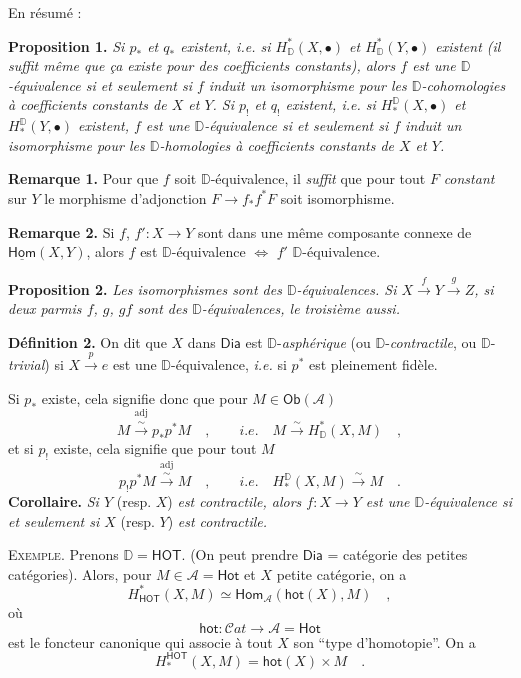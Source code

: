 \documentclass[11pt]{article}
\newcommand{\printedpage}[1]{\marginpar{\footnotesize p.~#1}}
\newcommand{\msp}[1]{\marginpar{\footnotesize [#1]}}
\newcommand{\uHom}{\underline{\mathsf{Hom}}}
\newcommand{\Ob}{\mathsf{Ob}}
\newcommand{\Dia}{\mathsf{Dia}}
\newcommand{\DD}{\mathbb{D}}
\newcommand{\sHom}{\mathsf{Hom}}
\newcommand{\HOT}{\mathsf{HOT}}
\newcommand{\cA}{\mathcal{A}}
\newcommand{\hot}{\mathsf{hot}}
\newcommand{\Hot}{\mathsf{Hot}}
\newcommand{\isolongto}{\overset{\sim}{\longrightarrow}}
\begin{document}
\clearpage
\printedpage{36}
\noindent\msp{page 62}

\noindent En résumé :

\noindent\textbf{Proposition 1.} \textit{Si $p_*$ et $q_*$ existent, i.e. si $H^*_{\DD}(X, \bullet)$ et $H^*_{\DD}(Y, \bullet)$ existent (il suffit même que ça existe pour des coefficients constants), alors $f$ est une $\DD$-équivalence si et seulement si $f$ induit un isomorphisme pour les $\DD$-cohomologies à coefficients constants de $X$ et $Y$. Si $p_!$ et $q_!$ existent, i.e. si $H^{\DD}_*(X, \bullet)$ et $H^{\DD}_*(Y, \bullet)$ existent, $f$ est une $\DD$-équivalence si et seulement si $f$ induit un isomorphisme pour les $\DD$-homologies à coefficients constants de $X$ et $Y$.}

\noindent\textbf{Remarque 1.} Pour que $f$ soit $\DD$-équivalence, il \textit{suffit} que pour tout $F$ \textit{constant} sur $Y$ le morphisme d'adjonction $F \to f_*f^*F$ soit isomorphisme.

\noindent\textbf{Remarque 2.} Si $f$, $f' : X \to Y$ sont dans une même composante connexe de $\uHom(X, Y)$, alors $f$ est $\DD$-équivalence $\Leftrightarrow$ $f'$ $\DD$-équivalence.

\noindent\textbf{Proposition 2.} \textit{Les isomorphismes sont des $\DD$-équivalences. Si $X \overset{f}{\to} Y \overset{g}{\to} Z$, si deux parmis $f$, $g$, $gf$ sont des $\DD$-équivalences, le troisième aussi.} %

\noindent\textbf{Définition 2.} On dit que $X$ dans $\Dia$ est $\DD$-\textit{asphérique} (ou $\DD$-\textit{contractile}, ou $\DD$-\textit{trivial}) si $X \overset{p}{\to} e$ est une $\DD$-équivalence, \textit{i.e.} si $p^*$ est pleinement fidèle.

Si $p_*$ existe, cela signifie donc que pour $M \in \Ob(\cA)$
\[
M \overset{\mathrm{adj}}{\isolongto} p_*p^*M \quad , \qquad \textit{i.e.} \quad M \isolongto H^*_{\DD}(X, M) \quad ,
\]
et si $p_!$ existe, cela signifie que pour tout $M$
\[
p_!p^*M \overset{\mathrm{adj}}{\isolongto} M \quad , \qquad \textit{i.e.} \quad H^{\DD}_*(X, M) \isolongto M \quad .
\]
\textbf{Corollaire.} \textit{Si $Y$} (resp. $X$) \textit{est contractile, alors $f : X \to Y$ est une $\DD$-équivalence si et seulement si $X$} (resp. $Y$) \textit{est contractile.}

\noindent\textsc{Exemple}. Prenons $\DD = \HOT$. (On peut prendre $\Dia$ = catégorie des petites catégories). Alors, pour $M \in \cA = \Hot$ et $X$ petite catégorie, on a
\[
H^*_{\HOT}(X, M) \simeq \sHom_{\cA}(\hot(X), M) \quad ,
\]
où
\[
\hot : \mathcal{C}\mathit{at} \longrightarrow \cA = \Hot
\]
est le foncteur canonique qui associe à tout $X$ son “type d'homotopie”. On a
\[
H^{\HOT}_*(X, M) = \hot(X) \times M \quad .
\]
\end{document}

